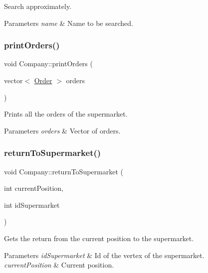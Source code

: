 Search approximately. 


\begin{DoxyParams}{Parameters}
{\em name} & Name to be searched. \\
\hline
\end{DoxyParams}
\mbox{\label{class_company_a07dc835ddc41d4156a50e270a7a7521c}} 
\subsubsection{\texorpdfstring{print\+Orders()}{printOrders()}}
{\footnotesize\ttfamily void Company\+::print\+Orders (\begin{DoxyParamCaption}\item[{vector$<$ \hyperlink{class_order}{Order} $>$}]{orders }\end{DoxyParamCaption})}



Prints all the orders of the supermarket. 


\begin{DoxyParams}{Parameters}
{\em orders} & Vector of orders. \\
\hline
\end{DoxyParams}
\mbox{\label{class_company_a113b614767a4ca7762c5f24cb5ec65cd}} 
\subsubsection{\texorpdfstring{return\+To\+Supermarket()}{returnToSupermarket()}}
{\footnotesize\ttfamily void Company\+::return\+To\+Supermarket (\begin{DoxyParamCaption}\item[{int}]{current\+Position,  }\item[{int}]{id\+Supermarket }\end{DoxyParamCaption})}



Gets the return from the current position to the supermarket. 


\begin{DoxyParams}{Parameters}
{\em id\+Supermarket} & Id of the vertex of the supermarket. \\
\hline
{\em current\+Position} & Current position. \\
\hline
\end{DoxyParams}
\mbox{\label{class_company_a64b1ee56a796ebd5bb3e2c3bf0e1d9b1}} 
